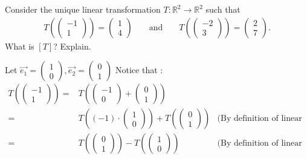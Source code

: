 \documentclass[12pt]{article}
\newenvironment{problem}[2][Problem]
{
	\begin{trivlist} 
		\item[\hskip \labelsep {\bfseries #1 #2:}]
	}
{
	\end{trivlist}
	}
\newenvironment{solution}[1][Solution]
{
	\begin{trivlist} 
		\item[\hskip \labelsep {\itshape #1:}]
	}
	{
	\end{trivlist}
}
\begin{document}
\newpage
\begin{problem}{6}
Consider the unique linear transformation $T:\mathbb{R}^2 \to \mathbb{R}^2$ such that
\begin{align*}
T\left(\begin{pmatrix}-1\\1\end{pmatrix}\right)=\begin{pmatrix}1\\4\end{pmatrix} && \text{ and } && T\left(\begin{pmatrix}-2\\3\end{pmatrix}\right)=\begin{pmatrix}2\\7\end{pmatrix} \text{.}
\end{align*}
What is $[T]$? Explain.
\noindent
\newline
\newline
\begin{solution}
Let $\vec{e_{1}}=\begin{pmatrix} 1\\0\end{pmatrix},\vec{e_{2}}=\begin{pmatrix} 0\\1\end{pmatrix}$
Notice that :
\begin{align*}
T\left(\begin{pmatrix}-1\\1\end{pmatrix}\right) =& T\left( \begin{pmatrix}-1\\0\end{pmatrix} + \begin{pmatrix}0\\1\end{pmatrix}\right) &\\
=&T\left( (-1)\cdot \begin{pmatrix}1\\0\end{pmatrix} \right)+ T\left(\begin{pmatrix}0\\1\end{pmatrix}\right) & \text{(By definition of linear transformation)}\\
=&T\left(\begin{pmatrix}0\\1\end{pmatrix}\right) - T\left(\begin{pmatrix}1\\0\end{pmatrix}\right) & \text{(By definition of linear Transformation)}\\

\end{align*}
\end{solution}
\end{problem}
\end{document}
